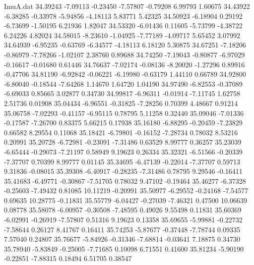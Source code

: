 \begin{filecontents}{ImuA.dat}
  34.39243   -7.09113   -0.23450   -7.57807   -0.79208    6.99793    1.60675
  34.43922   -6.38285   -0.33978   -5.94856   -4.18113    5.83771    5.42325
  34.50923   -6.18904    0.29192   -6.73699   -1.50195    6.21936    1.82047
  34.53320   -6.01436    0.11605   -5.73799   -4.38722    6.24226    4.82024
  34.58015   -8.23610   -1.04925   -7.77189   -4.09717    5.65452    3.07992
  34.64939   -6.95235   -0.63769   -6.34577   -4.18113    6.18120    5.30875
  34.67251   -7.18206   -0.86979   -7.78266   -1.02107    2.38760    0.89688
  34.74250   -7.19043   -0.80877   -6.97029   -0.16617   -0.01680    0.61446
  34.76637   -7.02174   -0.08136   -8.20020   -1.27296    0.89916   -0.47706
  34.81190   -6.92842   -0.06221   -6.19980   -0.63179    1.44110    0.66789
  34.92800   -6.80040   -0.18544   -7.64268    1.14670    1.64720    1.04190
  34.97490   -6.82553   -0.37089   -6.69033    0.85665    3.02877    0.34730
  34.99817   -6.96311   -0.01914   -7.11745    1.62758    2.51736    0.01908
  35.04434   -6.96551   -0.31825   -7.28256    0.70399    4.48667    0.91214
  35.06758   -7.02293   -0.41157   -6.95115    0.78795    5.11258    0.32440
  35.09046   -7.01336   -0.17587   -7.26700    0.83375    5.66215    0.17938
  35.16180   -6.88295   -0.20459   -7.23829    0.66582    8.29554    0.11068
  35.18421   -6.79801   -0.16152   -7.28734    0.78032    8.53216    0.20991
  35.20728   -6.72981   -0.23091   -7.31486    0.63529    8.99777    0.36257
  35.23039   -6.65444   -0.29073   -7.21197    0.58949    9.19623    0.26334
  35.32321   -6.51566   -0.20339   -7.37707    0.70399    8.99777    0.01145
  35.34695   -6.47139   -0.22014   -7.37707    0.59713    9.31836   -0.08015
  35.39308   -6.40917   -0.28235   -7.31486    0.78795    9.29546   -0.16411
  35.41683   -6.49771   -0.30867   -7.51705    0.78032    9.47102   -0.19464
  35.46277   -6.37328   -0.25603   -7.49432    0.81085   10.11219   -0.20991
  35.50977   -6.29552   -0.24168   -7.54577    0.69635   10.28775   -0.11831
  35.55779   -6.04427   -0.27039   -7.46321    0.47500   10.06639    0.08778
  35.58078   -6.00957   -0.30508   -7.48595    0.49026    9.55498    0.11831
  35.60369   -6.02991   -0.26919   -7.57807    0.51316    9.19623    0.13358
  35.69655   -5.99881   -0.22732   -7.58644    0.26127    8.41767    0.16411
  35.74253   -5.87677   -0.37448   -7.78744    0.09335    7.57040    0.24807
  35.76677   -5.84926   -0.31346   -7.68814   -0.03641    7.18875    0.34730
  35.78940   -5.83849   -0.25005   -7.71685    0.10098    6.71551    0.41600
  35.81234   -5.90190   -0.22851   -7.88315    0.18494    6.51705    0.38547

\end{filecontents}
